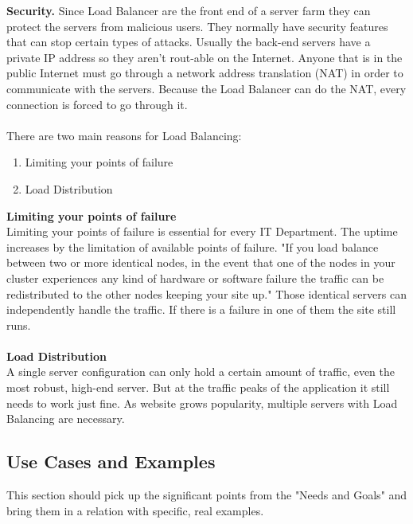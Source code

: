 \documentclass[12p]{article}
\begin{document}
	\newpage
	\textbf{Security.} Since Load Balancer are the front end of a server farm they can protect the servers from malicious users. They normally have security features that can stop certain types of attacks. Usually the back-end servers have a private IP address so they aren't rout-able on the Internet. Anyone that is in the public Internet must go through a network address translation (NAT) in order to communicate with the servers. Because the Load Balancer can do the NAT, every connection is forced to go through it.\cite{lb_SFC} \\\\
	There are two main reasons for Load Balancing:
	\begin{enumerate}
		\item Limiting your points of failure
		\item Load Distribution
		\\
	\end{enumerate}
	
	\textbf{Limiting your points of failure}\\
	Limiting your points of failure is essential for every IT Department. The uptime increases by the limitation of available points of failure. "If you load balance between two or more identical nodes, in the event that one of the nodes in your cluster experiences any kind of hardware or software failure the traffic can be redistributed to the other nodes keeping your site up." \cite{liquidweb} Those identical servers can independently handle the traffic. If there is a failure in one of them the site still runs.
	\\\\
	\textbf{Load Distribution}\\ 
	A single server configuration can only hold a certain amount of traffic, even the most robust, high-end server. But at the traffic peaks of the application it still needs to work just fine. As website grows popularity, multiple servers with Load Balancing are necessary. \cite{liquidweb}
	
	\subsection{Use Cases and Examples}
	This section should pick up the significant points from the "Needs and Goals" and bring them in a relation with specific, real examples.
	
\end{document}
